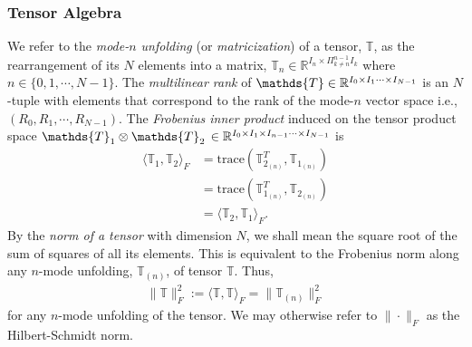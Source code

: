 \subsubsection{Tensor Algebra}
%
We refer to the \textit{mode-$n$ unfolding} (or \textit{matricization}) of a tensor, $\mathds{T}$, as the rearrangement of its $N$ elements into a matrix, $\mathds{T}_{n} \in \mathbb{R}^{I_n \times \Pi^{n-1}_{k\neq n} I_k}$  where $n \in \{0, 1, \cdots, N-1\}$. The \textit{multilinear rank}  of $\mathds{T} \in \reline^{I_0 \times I_1 \cdots \times I_{N-1}}$ is an $N$-tuple with elements that correspond to the rank of the mode-$n$ vector space i.e., $\left(R_0, R_1, \cdots, R_{N-1}\right)$. The \textit{Frobenius inner product} induced on the  tensor product space $\mathds{T}_1 \otimes \mathds{T}_2 \, \in \reline^{I_0 \times I_1 \times I_{n-1} \cdots \times I_{N-1}}$ is 
%
\begin{align}
	\langle \mathds{T}_1, \mathds{T}_2 \rangle_F &= \text{trace} \left(\mathds{T}_{2_{(n)}}^T, \mathds{T}_{1_{(n)}} \right) \nonumber \\
	&= \text{trace} \left(\mathds{T}_{1_{(n)}}^T, \mathds{T}_{2_{(n)}} \right) \label{eq:hilbert-schmidt-inner-product} \\
	& = \langle \mathds{T}_2, \mathds{T}_1 \rangle_F. \nonumber
\end{align}
%
By the \textit{norm of a tensor} with dimension $N$, we shall mean the square root of the sum of squares of all its elements. This is equivalent to the Frobenius norm along any $n$-mode unfolding, $\mathds{T}_{(n)}$, of tensor $\mathds{T}$. Thus, 
%
\begin{align}
	\|\mathds{T}\|_F^2 := \langle \mathds{T}, \mathds{T} \rangle_F = \|\mathds{T}_{(n)}\|^2_F
\end{align}
%
for any $n$-mode unfolding of the tensor. We may otherwise refer to  $\|\cdot \|_F$ as the Hilbert-Schmidt norm. 

